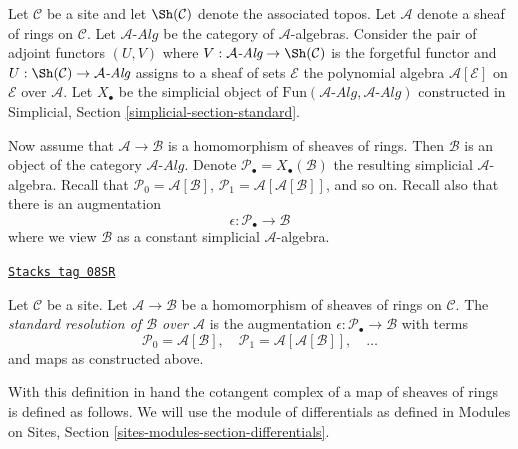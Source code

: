 \medskip\noindent
Let $\mathcal{C}$ be a site and let $\Sh(\mathcal{C})$ denote the
associated topos. Let $\mathcal{A}$ denote a sheaf of rings
on $\mathcal{C}$. Let $\mathcal{A}\textit{-Alg}$ be the category of
$\mathcal{A}$-algebras. Consider the pair of adjoint functors $(U, V)$ where
$V : \mathcal{A}\textit{-Alg} \to \Sh(\mathcal{C})$ is the forgetful functor and
$U : \Sh(\mathcal{C}) \to \mathcal{A}\textit{-Alg}$ assigns to a sheaf of sets
$\mathcal{E}$ the polynomial algebra $\mathcal{A}[\mathcal{E}]$ on
$\mathcal{E}$ over $\mathcal{A}$.
Let $X_\bullet$ be the simplicial object of
$\text{Fun}(\mathcal{A}\textit{-Alg}, \mathcal{A}\textit{-Alg})$
constructed in
Simplicial, Section \ref{simplicial-section-standard}.

\medskip\noindent
Now assume that $\mathcal{A} \to \mathcal{B}$ is a homomorphism of sheaves
of rings. Then $\mathcal{B}$ is an object of the category
$\mathcal{A}\textit{-Alg}$. Denote
$\mathcal{P}_\bullet = X_\bullet(\mathcal{B})$ the resulting
simplicial $\mathcal{A}$-algebra.
Recall that
$\mathcal{P}_0 = \mathcal{A}[\mathcal{B}]$,
$\mathcal{P}_1 = \mathcal{A}[\mathcal{A}[\mathcal{B}]]$, and so on.
Recall also that there is an augmentation
$$
\epsilon : \mathcal{P}_\bullet \longrightarrow \mathcal{B}
$$
where we view $\mathcal{B}$ as a constant simplicial $\mathcal{A}$-algebra.

\begin{definition}
\label{cotangent-definition-standard-resolution-sheaves-rings}
\href{https://stacks.math.columbia.edu/tag/08SR}{\texttt{Stacks tag 08SR}}

Let $\mathcal{C}$ be a site.
Let $\mathcal{A} \to \mathcal{B}$ be a homomorphism of sheaves of rings
on $\mathcal{C}$. The {\it standard resolution of $\mathcal{B}$ over
$\mathcal{A}$} is the augmentation
$\epsilon : \mathcal{P}_\bullet \to \mathcal{B}$
with terms
$$
\mathcal{P}_0 = \mathcal{A}[\mathcal{B}],\quad
\mathcal{P}_1 = \mathcal{A}[\mathcal{A}[\mathcal{B}]],\quad \ldots
$$
and maps as constructed above.
\end{definition}

With this definition in hand the cotangent complex of a map of sheaves
of rings is defined as follows.
We will use the module of differentials as defined in
Modules on Sites, Section \ref{sites-modules-section-differentials}.


